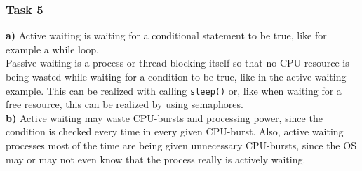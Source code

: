\documentclass[12pt, a4paper]{article}
\begin{document}
\subsubsection*{Task 5}
\textbf{a)} Active waiting is waiting for a conditional statement to be true, like for example a while loop. \\
Passive waiting is a process or thread blocking itself so that no CPU-resource is being wasted while waiting for a condition to be true, like in the active waiting example. This can be realized with calling \verb|sleep()| or, like when waiting for a free resource, this can be realized by using semaphores. \\
\textbf{b)} Active waiting may waste CPU-bursts and processing power, since the condition is checked every time in every given CPU-burst. Also, active waiting processes most of the time are being given unnecessary CPU-bursts, since the OS may or may not even know that the process really is actively waiting.
\end{document}
